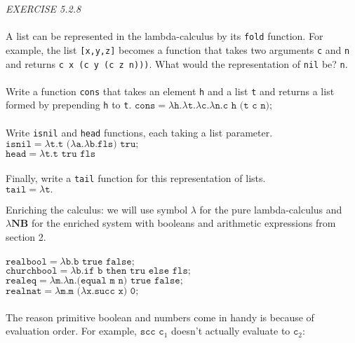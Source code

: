 \documentclass{article}
\begin{document}
\begin{siderules}\color{blue}\textit{EXERCISE 5.2.8}\color{black}\\\\
    \color{blue}A list can be represented in the lambda-calculus by its \texttt{fold} function. For example, the list \texttt{[x,y,z]} becomes a function that takes two arguments \texttt{c} and \texttt{n} 
    and returns \texttt{c x (c y (c z n)))}. What would the representation of \texttt{nil} be? \color{black} \texttt{n}.\\\\
    \color{blue}   Write a function \texttt{cons} that takes an element \texttt{h} and a list \texttt{t} and returns a list formed by prepending \texttt{h} to \texttt{t}. \color{black} 
    \(\texttt{cons}=\lambda \texttt{h.}\lambda \texttt{t.}\lambda \texttt{c.}\lambda \texttt{n.c h (t c n);}\)\\\\
    \color{blue}Write \texttt{isnil} and \texttt{head} functions, each taking a list parameter. \color{black}
\(\texttt{isnil}=\lambda \texttt{t.t (}\lambda \texttt{a.}\lambda \texttt{b.fls) tru;}\)\\
    \(\texttt{head}=\lambda \texttt{t.t tru fls}\)\\\\
    \color{blue}Finally, write a \texttt{tail} function for this representation of lists.\\\color{black}
    \(\texttt{tail}=\lambda \texttt{t.}\)
\end{siderules}
Enriching the calculus: we will use symbol \(\lambda\) for the pure lambda-calculus and \(\lambda \textbf{NB}\) for the enriched system with booleans and arithmetic expressions from section 2.\\\\
\(\texttt{realbool}=\lambda \texttt{b.b true false;}\)\\
\(\texttt{churchbool}=\lambda \texttt{b.if b then tru else fls;}\)\\
\(\texttt{realeq}=\lambda \texttt{m.}\lambda \texttt{n.(equal m n) true false;}\)\\
\(\texttt{realnat}=\lambda \texttt{m.m (}\lambda \texttt{x.succ x) 0;}\)\\\\
The reason primitive boolean and numbers come in handy is because of evaluation order. For example, \(\texttt{scc c}_{1}\) doesn't actually evaluate to \(\texttt{c}_{2}\):\\\\
\end{document}
